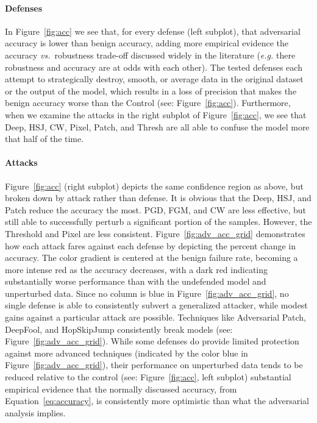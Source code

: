 \documentclass[lettersize,journal]{IEEEtran}
\newcommand{\eg}{\textit{e.g.}\xspace}
\begin{document}
\paragraph{Defenses}
    In Figure~\ref{fig:acc} we see that, for every defense (left subplot), that adversarial accuracy is lower than benign accuracy, adding more empirical evidence the accuracy \textit{vs.}~robustness trade-off discussed widely in the literature (\eg there robustness and accuracy are at odds with each other). The tested defenses each attempt to strategically destroy, smooth, or average data in the original dataset or the output of the model, which results in a loss of precision that makes the benign accuracy worse than the Control (see: Figure~\ref{fig:acc}). Furthermore, when we examine the attacks in the right subplot of Figure~\ref{fig:acc}, we see that Deep, HSJ, CW, Pixel, Patch, and Thresh are all able to confuse the model more that half of the time.

\paragraph{Attacks}
    Figure~\ref{fig:acc} (right subplot) depicts the same confidence region as above, but broken down by attack rather than defense. It is obvious that the Deep, HSJ, and Patch reduce the accuracy the most. PGD, FGM, and CW are less effective, but still able to successfully perturb a significant portion of the samples. However, the Threshold and Pixel are less consistent. Figure~\ref{fig:adv_acc_grid} demonstrates how each attack fares against each defense by depicting the percent change in accuracy. The color gradient is centered at the benign failure rate, becoming a more intense red as the accuracy decreases, with a dark red indicating substantially worse performance than with the undefended model and unperturbed data. Since no column is blue in Figure~\ref{fig:adv_acc_grid}, no single defense is able to consistently subvert a generalized attacker, while modest gains against a particular attack are possible. Techniques like Adversarial Patch, DeepFool, and HopSkipJump consistently break models (see: Figure~\ref{fig:adv_acc_grid}). While some defenses do provide limited protection against more advanced techniques (indicated by the color blue in Figure~\ref{fig:adv_acc_grid}), their performance on unperturbed data tends to be reduced relative to the control (see: Figure~\ref{fig:acc}, left subplot) substantial empirical evidence that the normally discussed accuracy, from Equation~\ref{eq:accuracy}, is consistently more optimistic than what the adversarial analysis implies.
\end{document}
